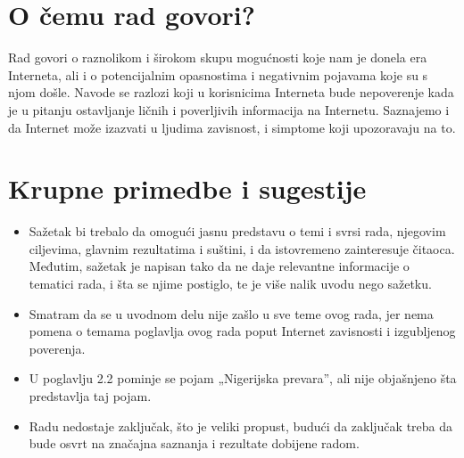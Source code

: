 \documentclass[a4paper]{report}
\begin{document}
\section{O čemu rad govori?}
Rad govori o raznolikom i širokom skupu mogućnosti koje nam je donela era Interneta, ali i o potencijalnim opasnostima i negativnim pojavama koje su s njom došle. Navode se razlozi koji u korisnicima Interneta bude nepoverenje kada je u pitanju ostavljanje ličnih i poverljivih informacija na Internetu. Saznajemo i da Internet može izazvati u ljudima zavisnost, i simptome koji upozoravaju na to.

\section{Krupne primedbe i sugestije}
\begin{itemize}
    \item Sažetak bi trebalo da omogući jasnu predstavu o temi i svrsi rada, njegovim ciljevima, glavnim rezultatima i suštini, i da istovremeno zainteresuje čitaoca. Međutim, sažetak je napisan tako da ne daje relevantne informacije o tematici rada, i šta se njime postiglo, te je više nalik uvodu nego sažetku. 
\end{itemize}
\begin{itemize}
    \item Smatram da se u uvodnom delu nije zašlo u sve teme ovog rada, jer nema pomena o temama poglavlja ovog rada poput Internet zavisnosti i izgubljenog poverenja. 
\end{itemize}
\begin{itemize}
    \item U poglavlju 2.2 pominje se pojam „Nigerijska prevara”, ali nije objašnjeno šta predstavlja taj pojam.
\end{itemize}
\begin{itemize}
    \item  Radu nedostaje zaključak, što je veliki propust, budući da zaključak treba da bude osvrt na značajna saznanja i rezultate dobijene radom. 
\end{itemize}
\end{document}
